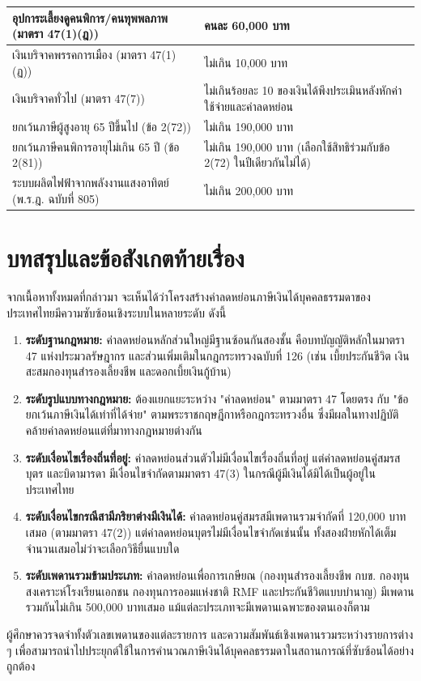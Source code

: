 \documentclass[12pt,a4paper]{article}
\begin{document}
\begin{longtable}{|p{6.5cm}|p{8cm}|}
\hline
อุปการะเลี้ยงดูคนพิการ/คนทุพพลภาพ (มาตรา 47(1)(ฎ)) & คนละ 60,000 บาท \\
\hline
เงินบริจาคพรรคการเมือง (มาตรา 47(1)(ฏ)) & ไม่เกิน 10,000 บาท \\
\hline
เงินบริจาคทั่วไป (มาตรา 47(7)) & ไม่เกินร้อยละ 10 ของเงินได้พึงประเมินหลังหักค่าใช้จ่ายและค่าลดหย่อน \\
\hline
ยกเว้นภาษีผู้สูงอายุ 65 ปีขึ้นไป (ข้อ 2(72)) & ไม่เกิน 190,000 บาท \\
\hline
ยกเว้นภาษีคนพิการอายุไม่เกิน 65 ปี (ข้อ 2(81)) & ไม่เกิน 190,000 บาท (เลือกใช้สิทธิร่วมกับข้อ 2(72) ในปีเดียวกันไม่ได้) \\
\hline
ระบบผลิตไฟฟ้าจากพลังงานแสงอาทิตย์ (พ.ร.ฎ. ฉบับที่ 805) & ไม่เกิน 200,000 บาท \\
\hline
\end{longtable}

\section{บทสรุปและข้อสังเกตท้ายเรื่อง}

จากเนื้อหาทั้งหมดที่กล่าวมา จะเห็นได้ว่าโครงสร้างค่าลดหย่อนภาษีเงินได้บุคคลธรรมดาของประเทศไทยมีความซับซ้อนเชิงระบบในหลายระดับ ดังนี้

\begin{enumerate}
    \item \textbf{ระดับฐานกฎหมาย:} ค่าลดหย่อนหลักส่วนใหญ่มีฐานซ้อนกันสองชั้น คือบทบัญญัติหลักในมาตรา 47 แห่งประมวลรัษฎากร และส่วนเพิ่มเติมในกฎกระทรวงฉบับที่ 126 (เช่น เบี้ยประกันชีวิต เงินสะสมกองทุนสำรองเลี้ยงชีพ และดอกเบี้ยเงินกู้บ้าน)
    \item \textbf{ระดับรูปแบบทางกฎหมาย:} ต้องแยกแยะระหว่าง "ค่าลดหย่อน" ตามมาตรา 47 โดยตรง กับ "ข้อยกเว้นภาษีเงินได้เท่าที่ได้จ่าย" ตามพระราชกฤษฎีกาหรือกฎกระทรวงอื่น ซึ่งมีผลในทางปฏิบัติคล้ายค่าลดหย่อนแต่ที่มาทางกฎหมายต่างกัน
    \item \textbf{ระดับเงื่อนไขเรื่องถิ่นที่อยู่:} ค่าลดหย่อนส่วนตัวไม่มีเงื่อนไขเรื่องถิ่นที่อยู่ แต่ค่าลดหย่อนคู่สมรส บุตร และบิดามารดา มีเงื่อนไขจำกัดตามมาตรา 47(3) ในกรณีผู้มีเงินได้มิได้เป็นผู้อยู่ในประเทศไทย
    \item \textbf{ระดับเงื่อนไขกรณีสามีภริยาต่างมีเงินได้:} ค่าลดหย่อนคู่สมรสมีเพดานรวมจำกัดที่ 120,000 บาทเสมอ (ตามมาตรา 47(2)) แต่ค่าลดหย่อนบุตรไม่มีเงื่อนไขจำกัดเช่นนั้น ทั้งสองฝ่ายหักได้เต็มจำนวนเสมอไม่ว่าจะเลือกวิธียื่นแบบใด
    \item \textbf{ระดับเพดานรวมข้ามประเภท:} ค่าลดหย่อนเพื่อการเกษียณ (กองทุนสำรองเลี้ยงชีพ กบข. กองทุนสงเคราะห์โรงเรียนเอกชน กองทุนการออมแห่งชาติ RMF และประกันชีวิตแบบบำนาญ) มีเพดานรวมกันไม่เกิน 500,000 บาทเสมอ แม้แต่ละประเภทจะมีเพดานเฉพาะของตนเองก็ตาม
\end{enumerate}

ผู้ศึกษาควรจดจำทั้งตัวเลขเพดานของแต่ละรายการ และความสัมพันธ์เชิงเพดานรวมระหว่างรายการต่าง ๆ เพื่อสามารถนำไปประยุกต์ใช้ในการคำนวณภาษีเงินได้บุคคลธรรมดาในสถานการณ์ที่ซับซ้อนได้อย่างถูกต้อง
\end{document}
